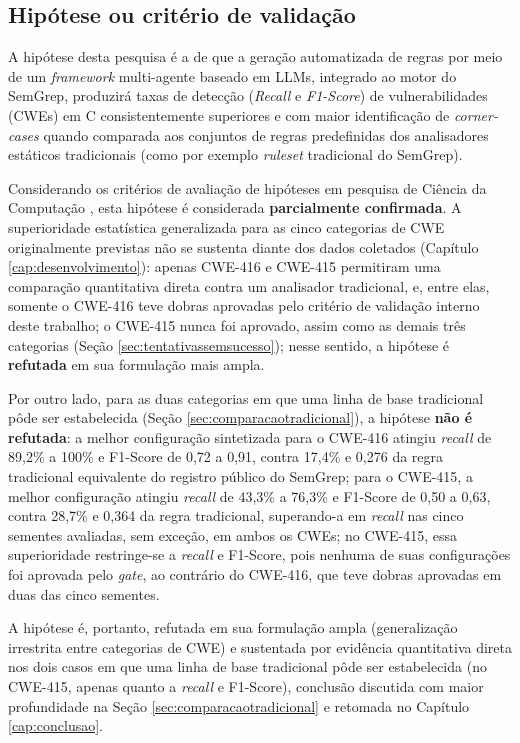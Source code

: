 \documentclass[
    12pt,                %
    openright,           %
    oneside,             %
    a4paper,             %
    english,             %
    brazil               %
]{abntex2}
\begin{document}
\subsection{Hipótese ou critério de validação}
\label{sec:hipotese}
\par
A hipótese desta pesquisa é a de que a geração automatizada de regras por meio de um \textit{framework} multi-agente baseado em LLMs, integrado ao motor do SemGrep, produzirá taxas de detecção (\textit{Recall} e \textit{F1-Score}) de vulnerabilidades (CWEs) em C consistentemente superiores e com maior identificação de \textit{corner-cases} quando comparada aos conjuntos de regras predefinidas dos analisadores estáticos tradicionais (como por exemplo \textit{ruleset} tradicional do SemGrep).
\par
Considerando os critérios de avaliação de hipóteses em pesquisa de Ciência da Computação \cite{Wazlawick2020}, esta hipótese é considerada \textbf{parcialmente confirmada}.
A superioridade estatística generalizada para as cinco categorias de CWE originalmente previstas não se sustenta diante dos dados coletados (Capítulo \ref{cap:desenvolvimento}): apenas CWE-416 e CWE-415 permitiram uma comparação quantitativa direta contra um analisador tradicional, e, entre elas, somente o CWE-416 teve dobras aprovadas pelo critério de validação interno deste trabalho; o CWE-415 nunca foi aprovado, assim como as demais três categorias (Seção \ref{sec:tentativassemsucesso}); nesse sentido, a hipótese é \textbf{refutada} em sua formulação mais ampla.
\par
Por outro lado, para as duas categorias em que uma linha de base tradicional pôde ser estabelecida (Seção \ref{sec:comparacaotradicional}), a hipótese \textbf{não é refutada}: a melhor configuração sintetizada para o CWE-416 atingiu \textit{recall} de 89,2\% a 100\% e F1-Score de 0,72 a 0,91, contra 17,4\% e 0,276 da regra tradicional equivalente do registro público do SemGrep; para o CWE-415, a melhor configuração atingiu \textit{recall} de 43,3\% a 76,3\% e F1-Score de 0,50 a 0,63, contra 28,7\% e 0,364 da regra tradicional, superando-a em \textit{recall} nas cinco sementes avaliadas, sem exceção, em ambos os CWEs; no CWE-415, essa superioridade restringe-se a \textit{recall} e F1-Score, pois nenhuma de suas configurações foi aprovada pelo \textit{gate}, ao contrário do CWE-416, que teve dobras aprovadas em duas das cinco sementes.
\par
A hipótese é, portanto, refutada em sua formulação ampla (generalização irrestrita entre categorias de CWE) e sustentada por evidência quantitativa direta nos dois casos em que uma linha de base tradicional pôde ser estabelecida (no CWE-415, apenas quanto a \textit{recall} e F1-Score), conclusão discutida com maior profundidade na Seção \ref{sec:comparacaotradicional} e retomada no Capítulo \ref{cap:conclusao}.
\end{document}
